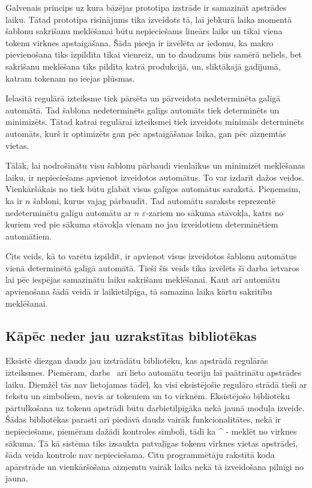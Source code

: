 Galvenais princips uz kura bāzējas prototipa izstrāde ir samazināt apstrādes laiku. Tātad prototipa risinājums tika izveidots tā, lai jebkurā laika momentā šablonu sakrišanu meklēšanai būtu nepieciešams lineārs laiks un tikai viena tokenu virknes apstaigāšana. Šāda pieeja ir izvēlēta ar iedomu, ka makro pievienošana tiks izpildīta tikai vienreiz, un to daudzums būs samērā neliels, bet sakrišanu meklēšana tiks pildīta katrā produkcijā, un, sliktākajā gadījumā, katram tokenam no ieejas plūsmas.

Ielasītā regulārā izteiksme tiek pārsēta un pārveidota nedeterminēta galīgā automātā. Tad šablona nedeterminēts galīgs automāts tiek determinēts un minimizēts. Tātad katrai regulārai izteiksmei tiek izveidots minimāls determinēts automāts, kurš ir optimizēts gan pēc apstaigāšanas laika, gan pēc aizņemtās vietas.

Tālāk, lai nodrošinātu visu šablonu pārbaudi vienlaikus un minimizēt meklēšanas laiku, ir nepieciešams apvienot izveidotos automātus. To var izdarīt dažos veidos. Vienkāršākais no tiek būtu glabāt visus galīgos automātus sarakstā. Pieņemsim, ka ir $n$ šabloni, kurus vajag pārbaudīt. Tad automātu saraksts reprezentē nedeterminētu galīgu automātu ar $n$ $\varepsilon$-zariem no sākuma stāvokļa, katrs no kuriem ved pie sākuma stāvokļa vienam no jau izveidotiem determinētiem automātiem.

Cits veids, kā to varētu izpildīt, ir apvienot visus izveidotos šablonu automātus vienā determinētā galīgā automātā. Tieši šīs veids tika izvēlēts šī darba ietvaros lai pēc iespējas samazinātu laiku sakrišanu meklēšanai. Kaut arī automātu apvienošana šādā veidā ir laikietilpīga, tā samazina laika kārtu sakritību meklēšanai.

\subsection{\label{sbs:prot_realizations}Kāpēc neder jau uzrakstītas bibliotēkas}

Eksistē diezgan daudz jau izstrādātu bibliotēku, kas apstrādā regulārās izteiksmes. Piemēram, darbs~\cite{RE2} arī lieto automātu teoriju lai paātrinātu apstrādes laiku. Diemžēl tās nav lietojamas tādēļ, ka visi eksistējošie regulāro strādā tieši ar tekstu un simboliem, nevis ar tokeniem un to virknēm. Eksistējošo bibliotēku pārtulkošana uz tokenu apstrādi būtu darbietilpīgāka nekā jaunā moduļa izveide. Šādas bibliotēkas parasti arī piedāvā daudz vairāk funkcionalitātes, nekā ir nepieciešams, piemēram dažādi kontroles simboli, tādi ka $\^$ - meklēt no virknes sākuma. Tā kā sistēma tiks izsaukta patvaļīgas tokenu virknes vietas apstrādei, šāda veida kontrole nav nepieciešama. Citu programmētāju rakstītā koda apārstrāde un vienkāršošana aizņemtu vairāk laika nekā tā izveidošana pilnīgi no jauna.

